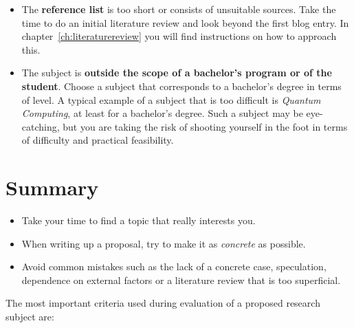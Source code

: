 \begin{itemize}
  \item The \textbf{reference list} is too short or consists of unsuitable sources. Take the time to do an initial literature review and look beyond the first blog entry. In chapter~\ref{ch:literaturereview} you will find instructions on how to approach this.
  \item The subject is \textbf{outside the scope of a bachelor's program or of the student}. Choose a subject that corresponds to a bachelor's degree in terms of level. A typical example of a subject that is too difficult is \textit{Quantum Computing}, at least for a bachelor's degree. Such a subject may be eye-catching, but you are taking the risk of shooting yourself in the foot in terms of difficulty and practical feasibility.     
\end{itemize}

\section{Summary}
\label{sec:subjectsummary}

\begin{itemize}
 \item Take your time to find a topic that really interests you.
 \item When writing up a proposal, try to make it as \emph{concrete} as possible.
 \item Avoid common mistakes such as the lack of a concrete case, speculation, dependence on external factors or a literature review that is too superficial.
\end{itemize}

The most important criteria used during evaluation of a proposed research subject are:

